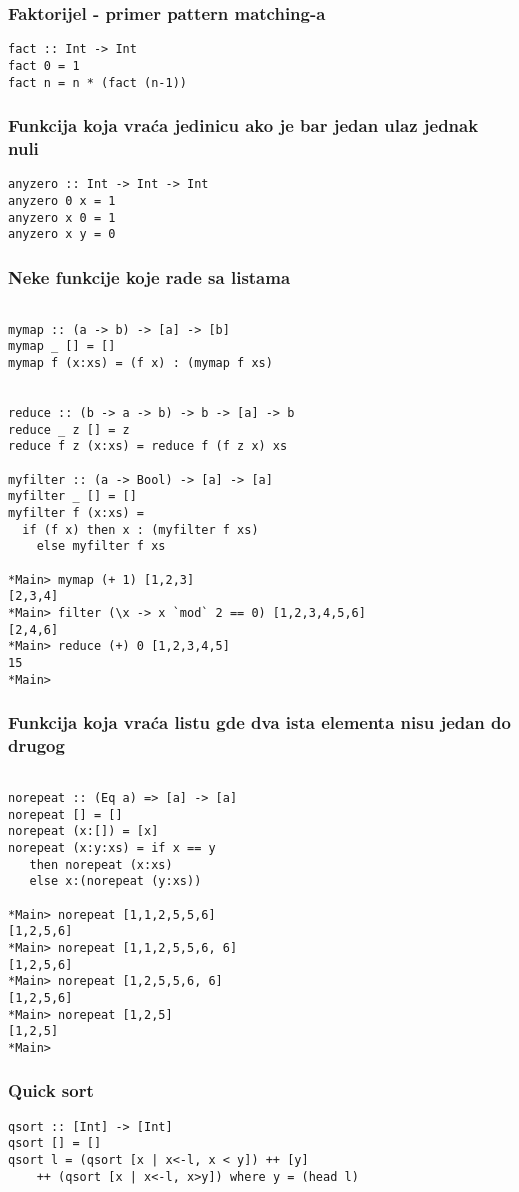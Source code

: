 \documentclass{beamer}
\begin{document}
\begin{frame}[fragile]
\frametitle{Faktorijel - primer pattern matching-a} 
\begin{lstlisting}
fact :: Int -> Int
fact 0 = 1
fact n = n * (fact (n-1))
\end{lstlisting}
\end{frame}

\begin{frame}[fragile]
\frametitle{Funkcija koja vraća jedinicu ako je bar jedan ulaz jednak nuli}
\begin{lstlisting}
anyzero :: Int -> Int -> Int
anyzero 0 x = 1
anyzero x 0 = 1
anyzero x y = 0
\end{lstlisting}
\end{frame}


\begin{frame}[fragile]
\frametitle{Neke funkcije koje rade sa listama}
\begin{lstlisting}

mymap :: (a -> b) -> [a] -> [b]
mymap _ [] = []
mymap f (x:xs) = (f x) : (mymap f xs)


reduce :: (b -> a -> b) -> b -> [a] -> b 
reduce _ z [] = z 
reduce f z (x:xs) = reduce f (f z x) xs

myfilter :: (a -> Bool) -> [a] -> [a]
myfilter _ [] = [] 
myfilter f (x:xs) = 
  if (f x) then x : (myfilter f xs) 
	else myfilter f xs

*Main> mymap (+ 1) [1,2,3]
[2,3,4]
*Main> filter (\x -> x `mod` 2 == 0) [1,2,3,4,5,6]
[2,4,6]
*Main> reduce (+) 0 [1,2,3,4,5]
15
*Main> 

\end{lstlisting}
\end{frame}

\begin{frame}[fragile]
\frametitle{Funkcija koja vraća listu gde dva ista elementa nisu jedan do drugog} 
\begin{lstlisting}

norepeat :: (Eq a) => [a] -> [a]
norepeat [] = [] 
norepeat (x:[]) = [x]
norepeat (x:y:xs) = if x == y 
   then norepeat (x:xs) 
   else x:(norepeat (y:xs))

*Main> norepeat [1,1,2,5,5,6]
[1,2,5,6]
*Main> norepeat [1,1,2,5,5,6, 6]
[1,2,5,6]
*Main> norepeat [1,2,5,5,6, 6]
[1,2,5,6]
*Main> norepeat [1,2,5]
[1,2,5]
*Main>

\end{lstlisting}
\end{frame}


\begin{frame}[fragile]
\frametitle{Quick sort}
\begin{lstlisting}
qsort :: [Int] -> [Int]
qsort [] = []
qsort l = (qsort [x | x<-l, x < y]) ++ [y] 
    ++ (qsort [x | x<-l, x>y]) where y = (head l)
\end{lstlisting}
\end{frame}
\end{document}
